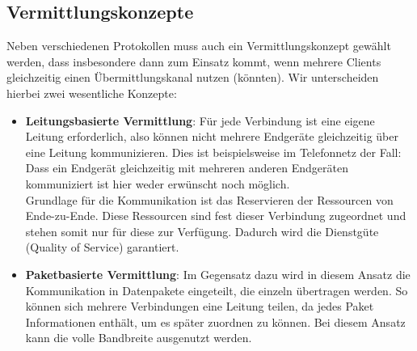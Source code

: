 \documentclass[11pt,a4paper]{scrartcl}
\begin{document}
\subsection{Vermittlungskonzepte}
Neben verschiedenen Protokollen muss auch ein Vermittlungskonzept gewählt werden, dass insbesondere dann zum Einsatz kommt, wenn mehrere Clients gleichzeitig einen Übermittlungskanal nutzen (könnten). Wir unterscheiden hierbei zwei wesentliche Konzepte:
\begin{itemize}
\item \textbf{Leitungsbasierte Vermittlung}: Für jede Verbindung ist eine eigene Leitung erforderlich, also können nicht mehrere Endgeräte gleichzeitig über eine Leitung kommunizieren. Dies ist beispielsweise im Telefonnetz der Fall: Dass ein Endgerät gleichzeitig mit mehreren anderen Endgeräten kommuniziert ist hier weder erwünscht noch möglich. \\
Grundlage für die Kommunikation ist das Reservieren der Ressourcen von Ende-zu-Ende. Diese Ressourcen sind fest dieser Verbindung zugeordnet und stehen somit nur für diese zur Verfügung. Dadurch wird die Dienstgüte (Quality of Service) garantiert.
\item \textbf{Paketbasierte Vermittlung}: Im Gegensatz dazu wird in diesem Ansatz die Kommunikation in Datenpakete eingeteilt, die einzeln übertragen werden. So können sich mehrere Verbindungen eine Leitung teilen, da jedes Paket Informationen enthält, um es später zuordnen zu können. Bei diesem Ansatz kann die volle Bandbreite ausgenutzt werden.
\end{itemize}
\end{document}

